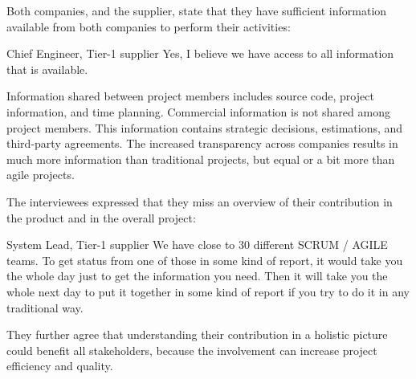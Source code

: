  Both companies, \company{} and the supplier, state that they have sufficient information available from both companies to perform their activities:

\begin{aquote}{Chief Engineer, Tier-1 supplier}
Yes, I believe we have access to all information that is available.
\end{aquote}

Information shared between project members includes source code, project information, and time planning. 
Commercial information is not shared among project members. 
This information contains strategic decisions, estimations, and third-party agreements. 
The increased transparency across companies results in much more information than traditional projects, but equal or a bit more than agile projects. 

 The interviewees expressed that they miss an overview of their contribution in the product and in the overall project:



\begin{aquote}{System Lead, Tier-1 supplier}
We have close to 30 different SCRUM / AGILE teams. To get status from one of those in some kind of report, it would take you the whole day just to get the information you need. Then it will take you the whole next day to put it together in some kind of report if you try to do it in any traditional way. 
\end{aquote}

They further agree that understanding their contribution in a holistic picture could benefit all stakeholders, because the involvement can increase project efficiency and quality.

